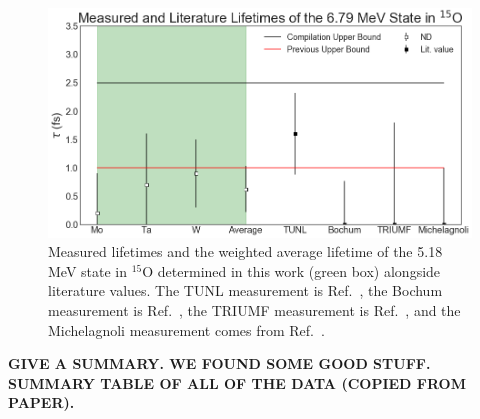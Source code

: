 \begin{figure}
\centering
\includegraphics[width=\linewidth]{figures/lifetimes679.png}
\caption{Measured lifetimes and the weighted average lifetime of the 5.18 MeV state in $^{15}$O determined in this work (green box) alongside literature values. The TUNL measurement is Ref.\ \cite{Bertone2001}, the Bochum measurement is Ref.\ \cite{Schurmann2008}, the TRIUMF measurement is Ref.\ \cite{Galinski2014}, and the Michelagnoli measurement comes from Ref.\ \cite{Michelagnoli2013}. }
\label{fig: lifetimes679}
\end{figure}


\textbf{GIVE A SUMMARY. WE FOUND SOME GOOD STUFF. SUMMARY TABLE OF ALL OF THE DATA (COPIED FROM PAPER).}



%
% 
% 
